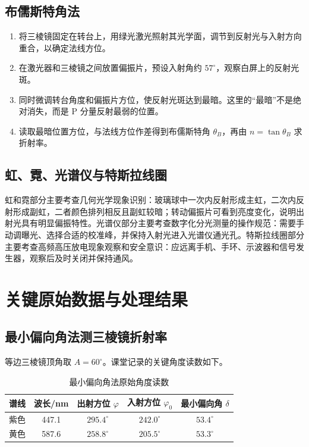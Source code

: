 \documentclass[UTF8,12pt,a4paper]{ctexart}
\begin{document}
\subsection{布儒斯特角法}

\begin{enumerate}[label=\arabic*.,leftmargin=2.2em]
    \item 将三棱镜固定在转台上，用绿光激光照射其光学面，调节到反射光与入射方向重合，以确定法线方位。
    \item 在激光器和三棱镜之间放置偏振片，预设入射角约 \(57^\circ\)，观察白屏上的反射光斑。
    \item 同时微调转台角度和偏振片方位，使反射光斑达到最暗。这里的“最暗”不是绝对消失，而是 P 分量反射最弱的位置。
    \item 读取最暗位置方位，与法线方位作差得到布儒斯特角 \(\theta_B\)，再由 \(n=\tan\theta_B\) 求折射率。
\end{enumerate}

\subsection{虹、霓、光谱仪与特斯拉线圈}

虹和霓部分主要考查几何光学现象识别：玻璃球中一次内反射形成主虹，二次内反射形成副虹，二者颜色排列相反且副虹较暗；转动偏振片可看到亮度变化，说明出射光具有明显偏振特性。光谱仪部分主要考查数字化分光测量的操作规范：需要手动调曝光、选择合适的校准峰，并保持入射光进入光谱仪通光孔。特斯拉线圈部分主要考查高频高压放电现象观察和安全意识：应远离手机、手环、示波器和信号发生器，观察后及时关闭并保持通风。

\section{关键原始数据与处理结果}

\subsection{最小偏向角法测三棱镜折射率}

等边三棱镜顶角取 \(A=60^\circ\)。课堂记录的关键角度读数如下。

\begin{table}[H]
\centering
\caption{最小偏向角法原始角度读数}
\small
\begin{tabular}{ccccc}
\toprule
谱线 & 波长/nm & 出射方位 \(\varphi\) & 入射方位 \(\varphi_0\) & 最小偏向角 \(\delta\) \\
\midrule
紫色 & 447.1 & \(295.4^\circ\) & \(242.0^\circ\) & \(53.4^\circ\) \\
黄色 & 587.6 & \(258.8^\circ\) & \(205.5^\circ\) & \(53.3^\circ\) \\
\bottomrule
\end{tabular}
\end{table}
\end{document}
